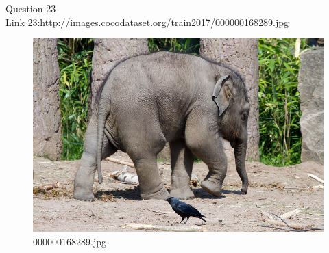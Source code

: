 Question 23\\
Link 23:http://images.cocodataset.org/train2017/000000168289.jpg
    \begin{figure}[h]
        \centering
        \includegraphics[width=0.8\linewidth]{../image set/easy/000000168289.jpg}
        \caption{000000168289.jpg}
    \end{figure}
